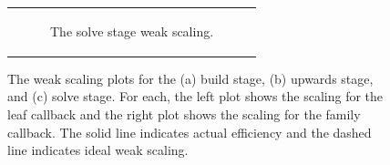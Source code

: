 \begin{figure}
\begin{tabular}{c}
\begin{subfigure}[t]{0.95\textwidth}
            \caption{The solve stage weak scaling.}
            \label{subfig:weak_solve}
        \end{subfigure}
        \\
    \end{tabular}
    \caption{The weak scaling plots for the (a) build stage, (b) upwards stage, and (c) solve stage. For each, the left plot shows the scaling for the leaf callback and the right plot shows the scaling for the family callback. The solid line indicates actual efficiency and the dashed line indicates ideal weak scaling.}
    \label{fig:weak_scaling_plots}
\end{figure}



